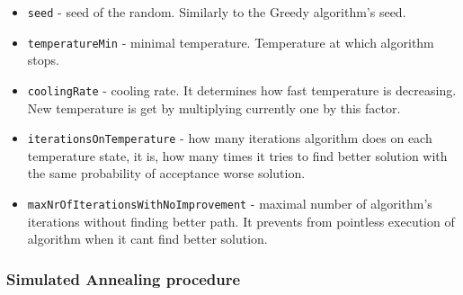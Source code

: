 \documentclass[titlepage]{article}
\begin{document}
\begin{itemize}
	\item \texttt{seed} - seed of the random. Similarly to the Greedy algorithm's seed.
	
	\item \texttt{temperatureMin} - minimal temperature. Temperature at which algorithm stops.
	
	\item \texttt{coolingRate} - cooling rate. It determines how fast temperature is decreasing. New temperature is get by multiplying currently one by this factor.
	
	\item \texttt{iterationsOnTemperature} - how many iterations algorithm does on each temperature state, it is, how many times it tries to find better solution with the same probability of acceptance worse solution.
	
	\item \texttt{maxNrOfIterationsWithNoImprovement} - maximal number of algorithm's iterations without finding better path. It prevents from pointless execution of algorithm when it cant find better solution.
\end{itemize}

\subsubsection{Simulated Annealing procedure}
\end{document}
